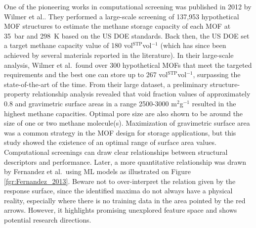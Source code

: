 \documentclass[main.tex]{subfiles}
\begin{document}
One of the pioneering works in computational screening was published in 2012 by Wilmer et al.\cite{Wilmer_2012}. They performed a large-scale screening of 137,953 hypothetical MOF structures to estimate the methane storage capacity of each MOF at \SI{35}{\bar} and \SI{298}{\kelvin} based on the US DOE standards. Back then, the US DOE set a target methane capacity value of 180 vol{\footnotesize$^\mathrm{STP}$}vol$^{-1}$ (which has since been achieved by several materials reported in the literature). In their large-scale analysis, Wilmer et al.\ found over 300 hypothetical MOFs that meet the targeted requirements and the best one can store up to 267 vol{\footnotesize$^\mathrm{STP}$}vol$^{-1}$, surpassing the state-of-the-art of the time. From their large dataset, a preliminary structure-property relationship analysis revealed that void fraction values of approximately 0.8 and gravimetric surface areas in a range 2500-3000 m$^2$g$^{-1}$ resulted in the highest methane capacities. Optimal pore size are also shown to be around the size of one or two methane molecule(s). Maximization of gravimetric surface area was a common strategy in the MOF design for storage applications, but this study showed the existence of an optimal range of surface area values. Computational screenings can draw clear relationships between structural descriptors and performance. Later, a more quantitative relationship was drawn by Fernandez et al.\ using ML models as illustrated on Figure \ref{fgr:Fernandez_2013}. Beware not to over-interpret the relation given by the response surface, since the identified maxima do not always have a physical reality, especially where there is no training data in the area pointed by the red arrows. However, it highlights promising unexplored feature space and shows potential research directions.
\end{document}

